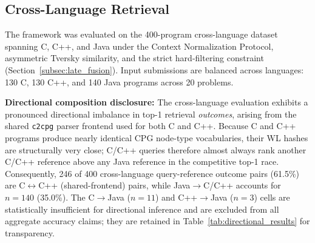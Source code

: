 \subsection{Cross-Language Retrieval}
\label{subsec:cross_lang_results}

The framework was evaluated on the 400-program cross-language dataset spanning C, C++, and Java under the Context Normalization Protocol, asymmetric Tversky similarity, and the strict hard-filtering constraint (Section~\ref{subsec:late_fusion}). Input submissions are balanced across languages: 130 C, 130 C++, and 140 Java programs across 20 problems.

\textbf{Directional composition disclosure:} The cross-language evaluation exhibits a pronounced directional imbalance in top-1 retrieval \textit{outcomes}, arising from the shared \texttt{c2cpg} parser frontend used for both C and C++. Because C and C++ programs produce nearly identical CPG node-type vocabularies, their WL hashes are structurally very close; C/C++ queries therefore almost always rank another C/C++ reference above any Java reference in the competitive top-1 race. Consequently, 246 of 400 cross-language query-reference outcome pairs (61.5\%) are C$\leftrightarrow$C++ (shared-frontend) pairs, while Java$\rightarrow$C/C++ accounts for $n=140$ (35.0\%). The C$\rightarrow$Java ($n=11$) and C++$\rightarrow$Java ($n=3$) cells are statistically insufficient for directional inference and are excluded from all aggregate accuracy claims; they are retained in Table~\ref{tab:directional_results} for transparency. 

\begin{table}[ht]
\caption{Cross-Language Top-1 Retrieval Accuracy by Directional Pair. Inputs for all languages are balanced (130~C, 130~C++, 140~Java). Outcomes per direction indicate competitive interference due to the use of a common C/C++ parser frontend. $^{\dagger}$The C$\rightarrow$Java ($n=11$) and C++$\rightarrow$Java ($n=3$) directions are statistically underpowered and not considered for any aggregate results.}
\label{tab:directional_results}
\centering
{}
\end{table}

